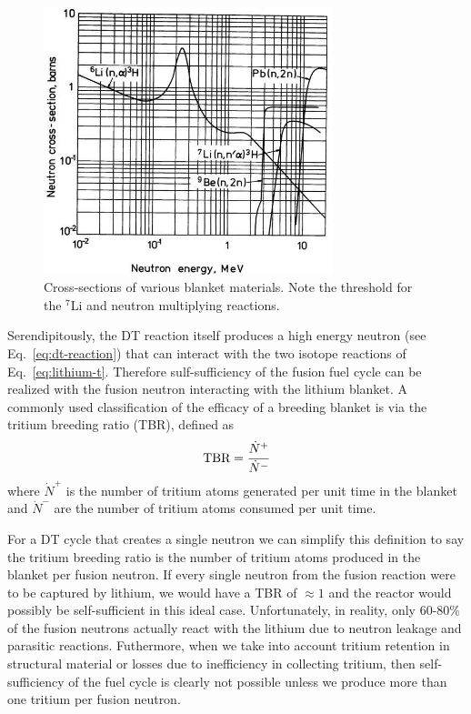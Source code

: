 \begin{figure}
	\centering
	\includegraphics[width=0.75\textwidth]{chapters/figures/breeding_xsecs} 
	\caption{Cross-sections of various blanket materials. Note the threshold for the $^7$Li and neutron multiplying reactions.}
	\label{fig:li-xsects}
\end{figure}

Serendipitously, the DT reaction itself produces a high energy neutron (see Eq.~\ref{eq:dt-reaction}) that can interact with the two isotope reactions of Eq.~\ref{eq:lithium-t}. Therefore sulf-sufficiency of the fusion fuel cycle can be realized with the fusion neutron interacting with the lithium blanket. A commonly used classification of the efficacy of a breeding blanket is via the tritium breeding ratio (TBR), defined as 
\begin{equation}
	\text{TBR} = \cfrac{\dot{N}^+}{\dot{N}^-}
\end{equation}
where $\dot{N}^+$ is the number of tritium atoms generated per unit time in the blanket and $\dot{N}^-$ are the number of tritium atoms consumed per unit time.

For a DT cycle that creates a single neutron we can simplify this definition to say the tritium breeding ratio is the number of tritium atoms produced in the blanket per fusion neutron. If every single neutron from the fusion reaction were to be captured by lithium, we would have a TBR of $\approx 1$ and the reactor would possibly be self-sufficient in this ideal case. Unfortunately, in reality, only 60-80\% of the fusion neutrons actually react with the lithium due to neutron leakage and parasitic reactions. Futhermore, when we take into account tritium retention in structural material or losses due to inefficiency in collecting tritium, then self-sufficiency of the fuel cycle is clearly not possible unless we produce more than one tritium per fusion neutron. 

